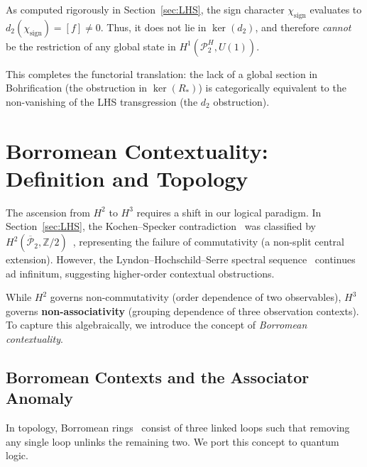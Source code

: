 \documentclass[11pt]{article}
\begin{document}
As computed rigorously in Section~\ref{sec:LHS}, the sign character $\chi_{\text{sign}}$ evaluates to $d_2(\chi_{\text{sign}}) = [f] \neq 0$. Thus, it does not lie in $\ker(d_2)$, and therefore \emph{cannot} be the restriction of any global state in $H^1(\mathcal{P}_2^H, U(1))$.

This completes the functorial translation: the lack of a global section in Bohrification (the obstruction in $\ker(R_*)$) is categorically equivalent to the non-vanishing of the LHS transgression (the $d_2$ obstruction).

\section{Borromean Contextuality: Definition and Topology}
\label{sec:borromean}

The ascension from $H^2$ to $H^3$ requires a shift in our logical paradigm. In Section~\ref{sec:LHS}, the Kochen--Specker contradiction~\cite{Peres90,Mermin90} was classified by $H^2(\overline{\mathcal{P}}_2, \mathbb{Z}/2)$~\cite{PaperIII}, representing the failure of commutativity (a non-split central extension). However, the Lyndon--Hochschild--Serre spectral sequence~\cite{HS53} continues ad infinitum, suggesting higher-order contextual obstructions.

While $H^2$ governs non-commutativity (order dependence of two observables), $H^3$ governs \textbf{non-associativity} (grouping dependence of three observation contexts). To capture this algebraically, we introduce the concept of \emph{Borromean contextuality}.

\subsection{Borromean Contexts and the Associator Anomaly}

In topology, Borromean rings~\cite{Rolfsen76} consist of three linked loops such that removing any single loop unlinks the remaining two. We port this concept to quantum logic.
\end{document}
